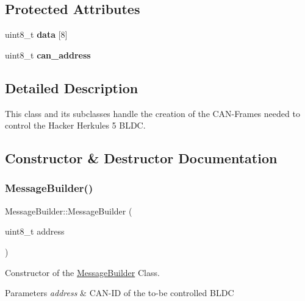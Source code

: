 \subsection*{Protected Attributes}
\begin{DoxyCompactItemize}
\item 
\mbox{\label{classMessageBuilder_abebf536b5645d60e62741e92a48f350a}} 
uint8\+\_\+t {\bfseries data} \mbox{[}8\mbox{]}
\item 
\mbox{\label{classMessageBuilder_af8e2143bb0e870152961fe420d38596b}} 
uint8\+\_\+t {\bfseries can\+\_\+address}
\end{DoxyCompactItemize}


\subsection{Detailed Description}
This class and its subclasses handle the creation of the C\+A\+N-\/\+Frames needed to control the Hacker Herkules 5 B\+L\+DC. 

\subsection{Constructor \& Destructor Documentation}
\mbox{\label{classMessageBuilder_a4323114db973ba35f2834b42d6b58aa7}} 
\subsubsection{\texorpdfstring{Message\+Builder()}{MessageBuilder()}}
{\footnotesize\ttfamily Message\+Builder\+::\+Message\+Builder (\begin{DoxyParamCaption}\item[{uint8\+\_\+t}]{address }\end{DoxyParamCaption})}



Constructor of the \hyperlink{classMessageBuilder}{Message\+Builder} Class. 


\begin{DoxyParams}{Parameters}
{\em address} & C\+A\+N-\/\+ID of the to-\/be controlled B\+L\+DC \\
\hline
\end{DoxyParams}


